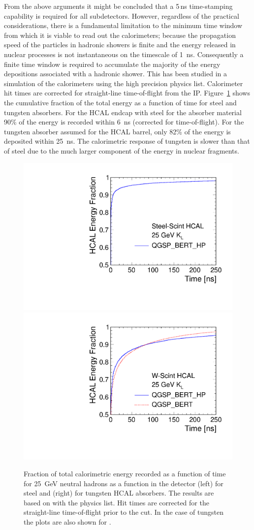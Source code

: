 From the above arguments it might be concluded that a 5\,ns time-stamping capability is required for all
subdetectors. However, regardless of the practical considerations, there is a fundamental limitation to
the minimum time window from which it is viable to read out the calorimeters;
because the propagation speed of the particles in hadronic showers is finite and
the energy released in nuclear processes is not instantaneous on the timescale
of 1~ns. Consequently a finite time window is required to accumulate the
majority of the energy depositions associated with a hadronic shower. This has
been studied in a \geant simulation of the \clicild calorimeters using the
high precision \qgspberthp physics list. Calorimeter hit times are corrected
for straight-line time-of-flight from the \acs{IP}. Figure~\ref{fig:chap3:caloTiming}
shows the cumulative fraction of the total energy as a function of time for
steel and tungsten absorbers. For the HCAL endcap with steel for the absorber
material 90\% of the energy is recorded within 6~ns (corrected for
time-of-flight). For the tungsten absorber assumed for the HCAL barrel, only
82\% of the energy is deposited within 25~ns. The calorimetric response of
tungsten is slower than that of steel due to the much larger component of the
energy in nuclear fragments. 
\begin{figure}[hbt]
\centering
\includegraphics[width=0.49\linewidth]{../Chap3_ExpCond_PhysPerfsReqs/hcalTimingSteel.pdf}
\includegraphics[width=0.49\linewidth]{../Chap3_ExpCond_PhysPerfsReqs/hcalTimingTungsten.pdf}
\caption{Fraction of total calorimetric energy recorded as a function of time
  for 25~GeV neutral hadrons as a function in the \clicild detector (left) for
  steel and (right) for tungsten HCAL absorbers. The results are based on \geant
  with the \qgspberthp physics list. Hit times are corrected for the
  straight-line time-of-flight prior to the cut. In the case of tungsten the
  plots are also shown for \qgspbert. \label{fig:chap3:caloTiming}}
\end{figure}

